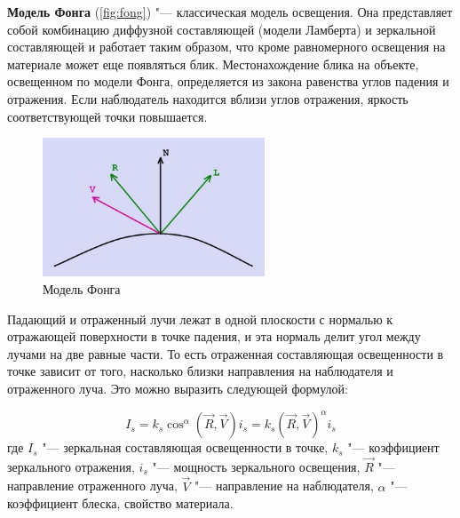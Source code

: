 \textbf{Модель Фонга} (\autoref{fig:fong}) "--- классическая модель освещения. Она представляет собой комбинацию диффузной составляющей (модели Ламберта) и зеркальной составляющей и работает таким образом, что кроме равномерного освещения на материале может еще появляться блик. Местонахождение блика на объекте, освещенном по модели Фонга, определяется из закона равенства углов падения и отражения. Если наблюдатель находится вблизи углов отражения, яркость соответствующей точки повышается.
\begin{figure}[H]
    \centering
    \includegraphics[width=0.59\textwidth]{src/img/fong.jpg}
    \caption{Модель Фонга}
    \label{fig:fong}
\end{figure}

Падающий и отраженный лучи лежат в одной плоскости с нормалью к отражающей поверхности в точке падения, и эта нормаль делит угол между лучами на две равные части. То есть отраженная составляющая освещенности в точке зависит от того, насколько близки направления на наблюдателя и отраженного луча. Это можно выразить следующей формулой:

\begin{equation}
    I_{s} = k_{s}\cos^{\alpha}(\vec{R}, \vec{V})i_{s} = k_{s}(\vec{R}, \vec{V})^{\alpha}i_{s}
\end{equation}
где $I_{s}$ "--- зеркальная составляющая освещенности в точке, $k_{s}$ "--- коэффициент зеркального отражения, $i_{s}$ "--- мощность зеркального освещения, $\vec{R}$ "--- направление отраженного луча, $\vec{V}$ "--- направление на наблюдателя, $\alpha$ "--- коэффициент блеска, свойство материала\cite{light_models}.